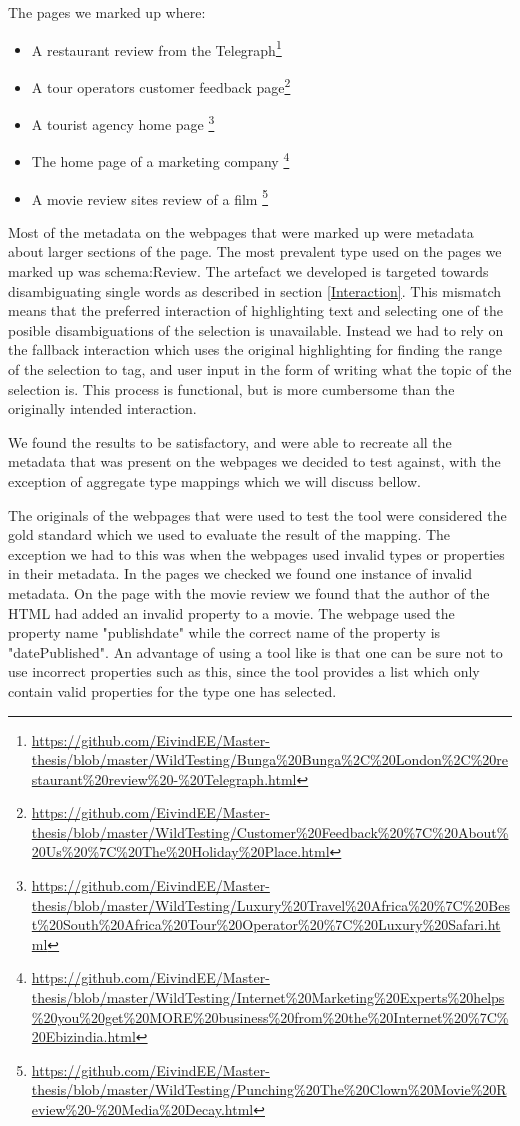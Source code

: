 The pages we marked up where:
\begin{itemize}
	\item A restaurant review from the Telegraph\footnote{\url{https://github.com/EivindEE/Master-thesis/blob/master/WildTesting/Bunga\%20Bunga\%2C\%20London\%2C\%20restaurant\%20review\%20-\%20Telegraph.html}}
	\item A tour operators customer feedback page\footnote{\url{https://github.com/EivindEE/Master-thesis/blob/master/WildTesting/Customer\%20Feedback\%20\%7C\%20About\%20Us\%20\%7C\%20The\%20Holiday\%20Place.html}}
	\item A tourist agency home page \footnote{\url{https://github.com/EivindEE/Master-thesis/blob/master/WildTesting/Luxury\%20Travel\%20Africa\%20\%7C\%20Best\%20South\%20Africa\%20Tour\%20Operator\%20\%7C\%20Luxury\%20Safari.html}}
	\item The home page of a marketing company \footnote{\url{https://github.com/EivindEE/Master-thesis/blob/master/WildTesting/Internet\%20Marketing\%20Experts\%20helps\%20you\%20get\%20MORE\%20business\%20from\%20the\%20Internet\%20\%7C\%20Ebizindia.html}}
	\item A movie review sites review of a film \footnote{\url{https://github.com/EivindEE/Master-thesis/blob/master/WildTesting/Punching\%20The\%20Clown\%20Movie\%20Review\%20-\%20Media\%20Decay.html}}
\end{itemize}

Most of the metadata on the webpages that were marked up were metadata about larger sections of the page.
The most prevalent type used on the pages we marked up was schema:Review.
The artefact we developed is targeted towards disambiguating single words as described in section \ref{Interaction}.
This mismatch means that the preferred interaction of highlighting text and selecting one of the posible
disambiguations of the selection is unavailable.
Instead we had to rely on the fallback interaction which uses the original highlighting for finding the range of
the selection to tag, and user input in the form of writing what the topic of the selection is.
This process is functional, but is more cumbersome than the originally intended interaction.


We found the results to be satisfactory, and were able to recreate all the metadata that was present on the webpages
we decided to test against, with the exception of aggregate type mappings which we will discuss bellow.

The originals of the webpages that were used to test the tool were considered the gold standard which we used to
evaluate the result of the mapping.
The exception we had to this was when the webpages used invalid types or properties in their metadata.
In the pages we checked we found one instance of invalid metadata.
On the page with the movie review we found that the author of the HTML had added an invalid property to a movie.
The webpage used the property name "publishdate" while the correct name of the property is "datePublished".
An advantage of using a tool like \theartefact is that one can be sure not to use incorrect properties such as this,
since the tool provides a list which only contain valid properties for the type one has selected.



